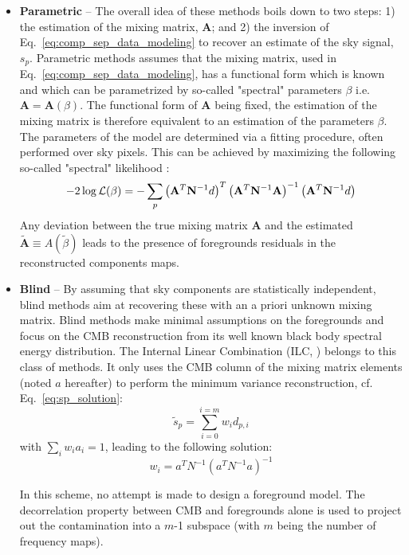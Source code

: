 \begin{itemize}
	\item \textbf{Parametric} -- The overall idea of these methods boils down to two steps: 1) the estimation of the mixing matrix, $\mathbf{A}$; and 2) the inversion of Eq.~\ref{eq:comp_sep_data_modeling} to recover an estimate of the sky signal, $s_p$.
	Parametric methods assumes that the mixing matrix, used in Eq.~\ref{eq:comp_sep_data_modeling}, has a functional form which is known and which can be parametrized by so-called "spectral" parameters $\beta$ i.e. $\mathbf{A} = \mathbf{A}(\beta)$. The functional form of $\mathbf{A}$ being fixed, the estimation of the mixing matrix is therefore equivalent to an estimation of the parameters $\beta$. The parameters of the model are determined via a fitting procedure, often performed over sky pixels. This can be achieved by maximizing the following so-called "spectral" likelihood \cite{brandt94,eriksen06}:
	\begin{eqnarray}
		\centering
			-2\log \mathcal{L}(\beta) = - \sum_p \left( \mathbf{A}^T\mathbf{N}^{-1} d\right)^T\left( \mathbf{A}^T\mathbf{N}^{-1} \mathbf{A}\right)^{-1}\left( \mathbf{A}^T\mathbf{N}^{-1} d\right)
	\end{eqnarray}
Any deviation between the true mixing matrix $\mathbf{A}$ and the estimated $\mathbf{\tilde A} \equiv A(\tilde \beta)$ leads to the presence of foregrounds residuals in the reconstructed components maps.
	\item \textbf{Blind} -- By assuming that sky components are statistically independent, blind methods aim at recovering these with an a priori unknown mixing matrix. Blind methods make minimal assumptions on the foregrounds and focus on the CMB reconstruction from its well known black body spectral energy distribution. The Internal Linear Combination (ILC, \cite{tegmark03}) belongs to this class of methods. It only uses the CMB column of the mixing matrix elements (noted $a$ hereafter) to perform the minimum variance reconstruction, cf. Eq.~\ref{eq:sp_solution}:
\begin{equation}
  \tilde s_p = \sum_{i=0}^{i=m} w_i d_{p,i}
\end{equation}
with $\sum_i  w_i a_i = 1$, leading to the following solution:
\begin{equation}
  w_i = a^T N^{-1} (a^TN^{-1} a)^{-1}
\end{equation}

In this scheme, no attempt is made to design a foreground model. The decorrelation property between CMB and foregrounds alone is used to project out the contamination into a $m$-1 subspace (with $m$ being the number of frequency maps).


\end{itemize}
